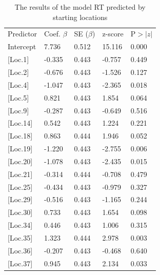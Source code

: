 \begin{longtable}{p{4cm}p{2cm}p{2cm}p{2cm}l}
	\hiderowcolors
	\caption[RT predicted by starting locations]{The results of the model RT predicted by starting locations} \\
	\hline \hline
	\multicolumn{1}{l}{Predictor} & \multicolumn{1}{l}{Coef. $\beta$} & \multicolumn{1}{l}{SE ($\beta$)} & \multicolumn{1}{l}{z-score} & \multicolumn{1}{r}{P$>|z|$} \\
	\hline \hline
	\showrowcolors
	Intercept       & 7.736  & 0.512 & 15.116 & 0.000 \\
	{[}Loc.1{]}     & -0.335 & 0.443 & -0.757 & 0.449 \\
	{[}Loc.2{]}     & -0.676 & 0.443 & -1.526 & 0.127 \\
	 \setrow{\bfseries} {[}Loc.4{]}     & \setrow{\bfseries}  -1.047 & \setrow{\bfseries}  0.443 & \setrow{\bfseries}  -2.365 & \setrow{\bfseries}  0.018  \\
	{[}Loc.5{]}     & 0.821  & 0.443 & 1.854  & 0.064 \\
	{[}Loc.9{]}     & -0.287 & 0.443 & -0.649 & 0.516 \\
	{[}Loc.14{]}    & 0.542  & 0.443 & 1.224  & 0.221 \\
	{[}Loc.18{]}    & 0.863  & 0.444 & 1.946  & 0.052 \\
	 \setrow{\bfseries} {[}Loc.19{]}    & \setrow{\bfseries}  -1.220 & \setrow{\bfseries}  0.443 & \setrow{\bfseries}  -2.755 & \setrow{\bfseries}  0.006  \\
	 \setrow{\bfseries} {[}Loc.20{]}    & \setrow{\bfseries}  -1.078 & \setrow{\bfseries}  0.443 & \setrow{\bfseries}  -2.435 & \setrow{\bfseries}  0.015 \\
	{[}Loc.21{]}    & -0.314 & 0.444 & -0.708 & 0.479 \\
	{[}Loc.25{]}    & -0.434 & 0.443 & -0.979 & 0.327 \\
	{[}Loc.29{]}    & -0.516 & 0.443 & -1.165 & 0.244 \\
	{[}Loc.30{]}    & 0.733  & 0.443 & 1.654  & 0.098 \\
	{[}Loc.34{]}    & 0.446  & 0.443 & 1.006  & 0.315 \\
	 \setrow{\bfseries} {[}Loc.35{]}    & \setrow{\bfseries}  1.323  & \setrow{\bfseries}  0.444 & \setrow{\bfseries}  2.978  & \setrow{\bfseries}  0.003   \\
	{[}Loc.36{]}    & -0.207 & 0.443 & -0.468 & 0.640   \\
	 \setrow{\bfseries} {[}Loc.37{]}    & \setrow{\bfseries}  0.945  & \setrow{\bfseries}  0.443 & \setrow{\bfseries}  2.134  & \setrow{\bfseries}  0.033   \\

\end{longtable}
